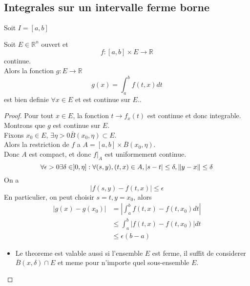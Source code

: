\documentclass[../main.tex]{subfiles}
\begin{document}
\subsection{Integrales sur un intervalle ferme borne}
Soit $I=[a,b]$ 
\begin{thm}
	Soit $E\in \mathbb{R}^n$ ouvert et 
	\[ 
		f:[a,b]\times E \to \mathbb{R}
	\]
continue.\\
Alors la fonction $g:E \to \mathbb{R}$ 
\[ 
	g( x) = \int_{ a }^{ b }f( t,x) dt
\]
est bien definie $\forall x \in E$ et est continue sur $E.$.\\
\end{thm}
\begin{proof}
	Pour tout $x\in E$, la fonction $t\to f_x( t) $ est continue et donc integrable.\\
	Montrons que $g$ est continue sur $E$.\\
	Fixons $x_0\in E$, $\exists \eta >0 \overline{B}( x_0,\eta) \subset E$.\\
	Alors la restriction de $f$ a $A=[a,b]\times\overline{B}( x_0,\eta) $.\\
	Donc $A$ est compact, et donc $f\vert_A$ est uniformement continue.
	\[ 
		\forall \epsilon >0 \exists \delta \in ]0,\eta]: \forall ( s,y ), ( t,x) \in A, |s-t| \leq \delta, \left\lVert y-x\right\rVert \leq \delta
	\]
On a 
\[ 
	|f( s,y) - f( t,x) | \leq \epsilon
\]
En particulier, on peut choisir $s=t, y=x_0$, alors
\begin{align*}
	| g( x) - g( x_0) | &= | \int_{ a }^{ b }f( t,x) - f( t,x_0) dt|\\
			    &\leq \int_{ a }^{ b } | f( t,x) - f( t,x_0) | dt\\
			    &\leq \epsilon( b-a) 
\end{align*}
\begin{rmq}
\begin{itemize}
	\item Le theoreme est valable aussi si l'ensemble $E$ est ferme, il suffit de considerer $\overline{B}( x,\delta) \cap E$ et meme pour n'importe quel sous-ensemble $E$.
\end{itemize}

\end{rmq}

	
\end{proof}
\end{document}
